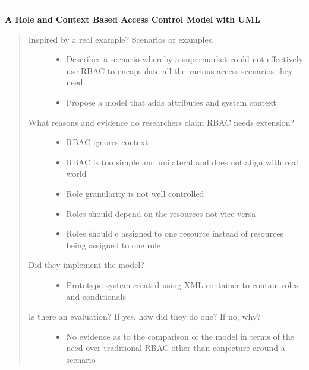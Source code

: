 \documentclass[letterpaper,10pt,english]{sphinxmanual}
\begin{document}
\bigskip\hrule{}\bigskip


\textbf{A Role and Context Based Access Control Model with UML}
\begin{quote}
\begin{description}
\item[{Inspired by a real example? Scenarios or examples.}] \leavevmode\begin{itemize}
\item {} 
Describes a scenario whereby a supermarket could not effectively use RBAC to encapsulate all the various access scenarios they need

\item {} 
Propose a model that adds attributes and system context

\end{itemize}

\item[{What reasons and evidence do researchers claim RBAC needs extension?}] \leavevmode\begin{itemize}
\item {} 
RBAC ignores context

\item {} 
RBAC is too simple and unilateral and does not align with real world

\item {} 
Role granularity is not well controlled

\item {} 
Roles should depend on the resources not vice-versa

\item {} 
Roles should e assigned to one resource instead of resources being assigned to one role

\end{itemize}

\item[{Did they implement the model?}] \leavevmode\begin{itemize}
\item {} 
Prototype system created using XML container to contain roles and conditionals

\end{itemize}

\item[{Is there an evaluation? If yes, how did they do one? If no, why?}] \leavevmode\begin{itemize}
\item {} 
No evidence as to the comparison of the model in terms of the need over traditional RBAC other than conjecture around a scenario


\end{itemize}
\end{description}
\end{quote}
\end{document}
